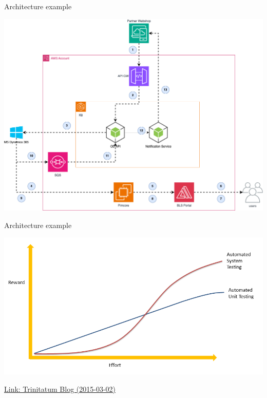 \begin{frame}{Architecture example}
  \begin{center}
    \includegraphics[scale=.3]{./assets/od.png}
  \end{center}
\end{frame}

\begin{frame}{Architecture example}
  \begin{center}
    \includegraphics[scale=.5]{./assets/e2e-unit-comparison}

    \href{https://www.trinitatum.com/blog/2015/3/2/test-automation-for-endur-part-2-beyond-unit-testing}{Link: Trinitatum Blog (2015-03-02)}
  \end{center}
\end{frame}


